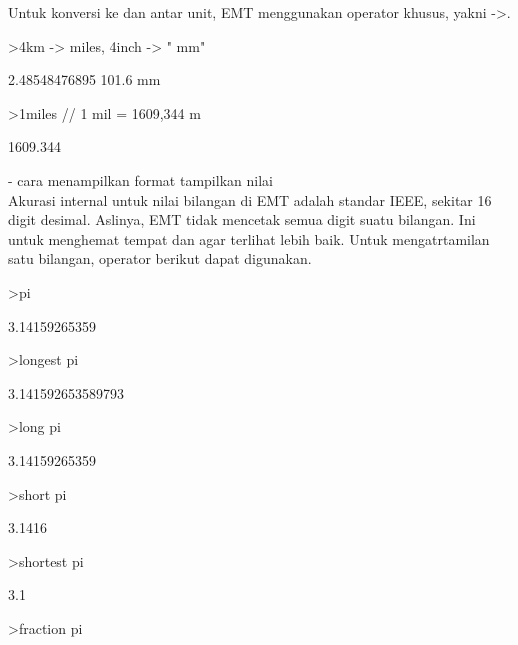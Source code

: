 \documentclass[a4paper,10pt]{article}
\begin{document}
\begin{eulernotebook}
\begin{eulercomment}
\begin{eulercomment}
\begin{eulercomment}
Untuk konversi ke dan antar unit, EMT menggunakan operator khusus,
yakni -\textgreater{}.
\end{eulercomment}
\begin{eulerprompt}
>4km -> miles, 4inch -> " mm"
\end{eulerprompt}
\begin{euleroutput}
  2.48548476895
  101.6 mm
\end{euleroutput}
\begin{eulerprompt}
>1miles  // 1 mil = 1609,344 m
\end{eulerprompt}
\begin{euleroutput}
  1609.344
\end{euleroutput}
\begin{eulercomment}
- cara menampilkan format tampilkan nilai\\
Akurasi internal untuk nilai bilangan di EMT adalah standar IEEE,
sekitar 16 digit desimal. Aslinya, EMT tidak mencetak semua digit
suatu bilangan. Ini untuk menghemat tempat dan agar terlihat lebih
baik. Untuk mengatrtamilan satu bilangan, operator berikut dapat
digunakan.
\end{eulercomment}
\begin{eulerprompt}
>pi
\end{eulerprompt}
\begin{euleroutput}
  3.14159265359
\end{euleroutput}
\begin{eulerprompt}
>longest pi
\end{eulerprompt}
\begin{euleroutput}
        3.141592653589793 
\end{euleroutput}
\begin{eulerprompt}
>long pi
\end{eulerprompt}
\begin{euleroutput}
  3.14159265359
\end{euleroutput}
\begin{eulerprompt}
>short pi
\end{eulerprompt}
\begin{euleroutput}
  3.1416
\end{euleroutput}
\begin{eulerprompt}
>shortest pi
\end{eulerprompt}
\begin{euleroutput}
     3.1 
\end{euleroutput}
\begin{eulerprompt}
>fraction pi
\end{eulerprompt}

\end{eulercomment}
\end{eulercomment}
\end{eulernotebook}
\end{document}
